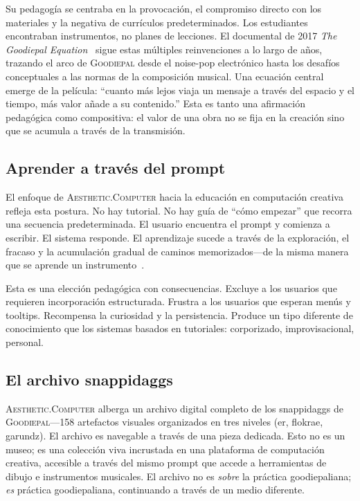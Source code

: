 \documentclass[10pt,letterpaper,twocolumn]{article}
\newcommand{\ac}{\textsc{Aesthetic.Computer}}
\newcommand{\gp}{\textsc{Goodiepal}}
\begin{document}
Su pedagogía se centraba en la provocación, el compromiso directo con los materiales y la negativa de currículos predeterminados. Los estudiantes encontraban instrumentos, no planes de lecciones. El documental de 2017 \emph{The Goodiepal Equation}~\citep{sanpakkila2017equation} sigue estas múltiples reinvenciones a lo largo de años, trazando el arco de \gp{} desde el noise-pop electrónico hasta los desafíos conceptuales a las normas de la composición musical. Una ecuación central emerge de la película: ``cuanto más lejos viaja un mensaje a través del espacio y el tiempo, más valor añade a su contenido.'' Esta es tanto una afirmación pedagógica como compositiva: el valor de una obra no se fija en la creación sino que se acumula a través de la transmisión.

\subsection{Aprender a través del prompt}

El enfoque de \ac{} hacia la educación en computación creativa refleja esta postura. No hay tutorial. No hay guía de ``cómo empezar'' que recorra una secuencia predeterminada. El usuario encuentra el prompt y comienza a escribir. El sistema responde. El aprendizaje sucede a través de la exploración, el fracaso y la acumulación gradual de caminos memorizados---de la misma manera que se aprende un instrumento~\citep{papert1980mindstorms}.

Esta es una elección pedagógica con consecuencias. Excluye a los usuarios que requieren incorporación estructurada. Frustra a los usuarios que esperan menús y tooltips. Recompensa la curiosidad y la persistencia. Produce un tipo diferente de conocimiento que los sistemas basados en tutoriales: corporizado, improvisacional, personal.

\subsection{El archivo snappidaggs}

\ac{} alberga un archivo digital completo de los snappidaggs de \gp{}---158 artefactos visuales organizados en tres niveles (er, flokrae, garundz). El archivo es navegable a través de una pieza dedicada. Esto no es un museo; es una colección viva incrustada en una plataforma de computación creativa, accesible a través del mismo prompt que accede a herramientas de dibujo e instrumentos musicales. El archivo no es \emph{sobre} la práctica goodiepaliana; \emph{es} práctica goodiepaliana, continuando a través de un medio diferente.
\end{document}
